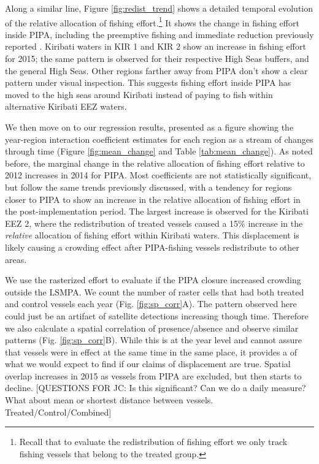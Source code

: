\documentclass[11pt,english]{article}
\begin{document}
Along a similar line, Figure \ref{fig:redist_trend} shows a detailed
temporal evolution of the relative allocation of fishing
effort.\footnote{Recall that to evaluate the redistribution of fishing effort we only track fishing vessels that belong to the treated group.}
It shows the change in fishing effort inside PIPA, including the
preemptive fishing and immediate reduction previously reported
\citep{mcdermott_2018}. Kiribati waters in KIR 1 and KIR 2 show an
increase in fishing effort for 2015; the same pattern is observed for
their respective High Seas buffers, and the general High Seas. Other
regions farther away from PIPA don't show a clear pattern under visual
inspection. This suggests fishing effort inside PIPA has moved to the high seas around Kiribati instead of paying to fish within alternative Kiribati EEZ waters.

We then move on to our regression results, presented as a figure showing
the year-region interaction coefficient estimates for each region as a
stream of changes through time (Figure \ref{fig:mean_change} and Table
\ref{tab:mean_change}). As noted before, the marginal change in the
relative allocation of fishing effort relative to 2012 increases in 2014
for PIPA. Most coefficients are not statistically significant, but
follow the same trends previously discussed, with a tendency for regions
closer to PIPA to show an increase in the relative allocation of fishing
effort in the post-implementation period. The largest increase is
observed for the Kiribati EEZ 2, where the redistribution of treated
vessels caused a 15\% increase in the \emph{relative} allocation of
fishing effort within Kiribati waters. This displacement is likely
causing a crowding effect after PIPA-fishing vessels redistribute to
other areas.

We use the rasterized effort to evaluate if the PIPA closure increased
crowding outside the LSMPA. We count the number of raster cells that
had both treated and control vessels each year (Fig.
\ref{fig:sp_corr}A). The pattern observed here could just be an artifact
of satellite detections increasing though time. Therefore we also
calculate a spatial correlation of presence/absence and observe similar
patterns (Fig. \ref{fig:sp_corr}B). While this is at the year level and
cannot assure that vessels were in effect at the same time in the same
place, it provides a of what we would expect to
find if our claims of displacement are true. Spatial overlap increases
in 2015 as vessels from PIPA are excluded, but then starts to decline. [QUESTIONS FOR JC: Is this significant? Can we do a daily measure? What about mean or shortest distance between vessels. Treated/Control/Combined]
\end{document}
